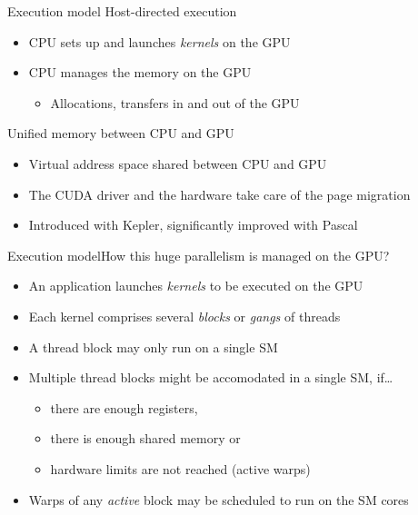 \documentclass[aspectratio=169,12pt]{beamer}
\begin{document}
\begin{frame}{Execution model}
  Host-directed execution
  \begin{itemize}
  \item CPU sets up and launches \emph{kernels} on the GPU
  \item CPU manages the memory on the GPU
    \begin{itemize}
    \item Allocations, transfers in and out of the GPU
    \end{itemize}
  \end{itemize}
  \pause\vfill
  Unified memory between CPU and GPU
  \begin{itemize}
  \item Virtual address space shared between CPU and GPU
  \item The CUDA driver and the hardware take care of the page migration
  \item Introduced with Kepler, significantly improved with Pascal
  \end{itemize}
\end{frame}


\begin{frame}{Execution model}{How this huge parallelism is managed on the GPU?}
  \begin{itemize}
  \item An application launches \emph{kernels} to be executed on the GPU
  \item Each kernel comprises several \emph{blocks} or \emph{gangs} of threads
  \item A thread block may only run on a single SM
  \item Multiple thread blocks might be accomodated in a single SM, if\dots
    \begin{itemize}
    \item there are enough registers,
    \item there is enough shared memory or
    \item hardware limits are not reached (active warps)
    \end{itemize}
  \item Warps of any \emph{active} block may be scheduled to run on the SM cores
  \end{itemize}
\end{frame}
\end{document}
